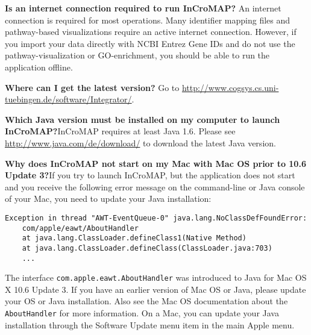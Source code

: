 \noindent \textbf{Is an internet connection required to run InCroMAP?}\newline
An internet connection is required for most operations. Many identifier mapping
files and pathway-based visualizations require an active internet connection.
However, if you import your data directly with NCBI Entrez Gene IDs and do not
use the pathway-visualization or GO-enrichment, you should be able to run the
application offline.\newline

\noindent \textbf{Where can I get the latest version?}\newline
Go to \url{http://www.cogsys.cs.uni-tuebingen.de/software/Integrator/}.\newline

\noindent \textbf{Which Java version must be installed on my computer to launch
InCroMAP?}\newline InCroMAP requires at least Java 1.6. Please see
\url{http://www.java.com/de/download/} to download the latest Java version.

\noindent \textbf{Why does InCroMAP not start on my Mac with Mac OS prior to
10.6 Update 3?}\newline If you try to launch InCroMAP, but the application does
not start and you receive the following error message on the command-line or
Java console of your Mac, you need to update your Java installation:
\begin{verbatim}
Exception in thread "AWT-EventQueue-0" java.lang.NoClassDefFoundError:
    com/apple/eawt/AboutHandler
    at java.lang.ClassLoader.defineClass1(Native Method)
    at java.lang.ClassLoader.defineClass(ClassLoader.java:703)
    ...
\end{verbatim}
The interface \texttt{com.apple.eawt.AboutHandler} was introduced to Java for
Mac OS X 10.6 Update 3. If you have an earlier version of Mac OS or Java,
please update your OS or Java installation. Also see the Mac OS documentation
about the \texttt{AboutHandler} for more information. On a Mac, you can update
your Java installation through the Software Update menu item in the main Apple
menu.

